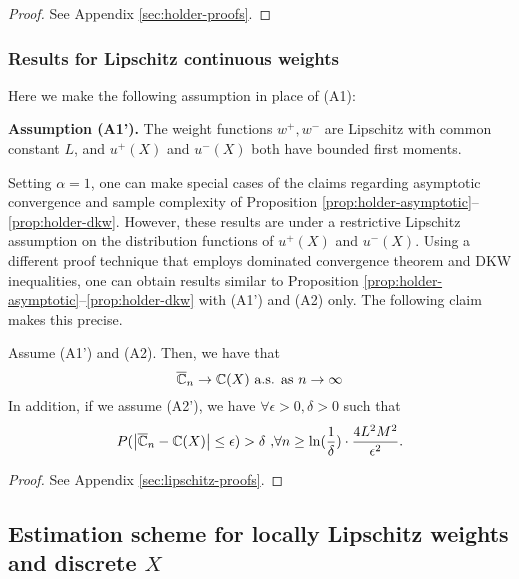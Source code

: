 \begin{proof}
%
See Appendix \ref{sec:holder-proofs}.
\end{proof}

\subsubsection{Results for Lipschitz continuous weights}
Here we make the following assumption in place of (A1):
 
\textbf{Assumption (A1').}  The weight functions $w^+, w^-$ are Lipschitz with common constant $L$, and 
$u^+(X)$ and $u^-(X)$ both have bounded first moments.

Setting $\alpha=1$, one can make special cases of the claims regarding asymptotic convergence and sample complexity of Proposition \ref{prop:holder-asymptotic}--\ref{prop:holder-dkw}. However, these results are under  a restrictive Lipschitz assumption on the distribution functions of $u^+(X)$ and $u^-(X)$. Using a different proof technique that employs dominated convergence theorem and DKW inequalities, one can obtain results similar to Proposition \ref{prop:holder-asymptotic}--\ref{prop:holder-dkw} with (A1') and (A2) only. The following claim makes this precise.

\begin{proposition}
\label{prop:lipschitz}
Assume (A1') and (A2). Then, we have that 
$$\overline {\mathbb{C}}_n
\rightarrow
\mathbb{C}(X)
 \text{   a.s. as } n\rightarrow \infty
$$
In addition, if we assume (A2'), we have $\forall \epsilon >0, \delta >0$ such that
$$
P(\left |\overline {\mathbb{C}}_n- \mathbb{C}(X) \right| \leq  \epsilon ) > \delta\text{     ,} \forall n \geq \ln(\frac{1}{\delta})\cdot 
\frac{4L^2 M^2}{\epsilon^{2}}.
$$
\end{proposition}
\begin{proof}
See Appendix \ref{sec:lipschitz-proofs}.
\end{proof}

\subsection{Estimation scheme for locally Lipschitz weights and discrete $X$}

